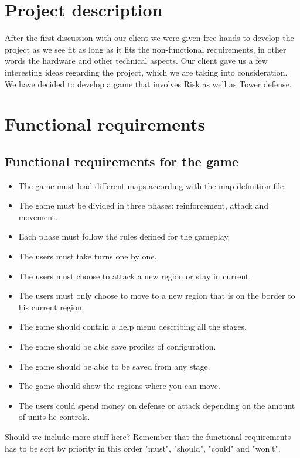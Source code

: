 \documentclass[12pt,a4paper]{article}
\begin{document}
\section{Project description}

After the first discussion with our client we were given free hands to
develop the project as we see fit as long as it fits the
non-functional requirements, in other words the hardware and other
technical aspects. Our client gave us a few interesting ideas
regarding the project, which we are taking into consideration. We have
decided to develop a game that involves Risk as well as Tower defense.

\section{Functional requirements}

\subsection{Functional requirements for the game}

\begin{itemize}
\item The game must load different maps according with the map definition
  file.
\item The game must be divided in three phases: reinforcement, attack
  and movement.
\item Each phase must follow the rules defined for the gameplay.
\item The users must take turns one by one.
\item The users must choose to attack a new region or stay in current.
\item The users must only choose to move to a new region that is on the
  border to his current region.
\item The game should contain a help menu describing all the stages.
\item The game should be able save profiles of configuration.
\item The game should be able to be saved from any stage.
\item The game should show the regions where you can move.
\item The users could spend money on defense or attack depending on the
  amount of units he controls.
\end{itemize}

\begin{todo}[Alberto]
  Should we include more stuff here? Remember that the functional
  requirements has to be sort by priority in this order "must", "should",
  "could" and "won't".
\end{todo}
\end{document}
